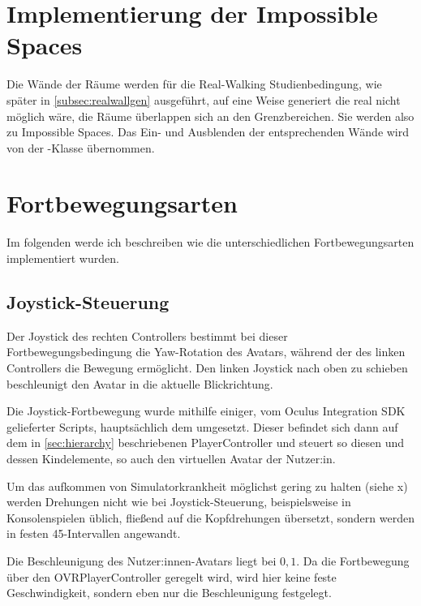 \section{Implementierung der Impossible Spaces}
Die Wände der Räume werden für die Real-Walking Studienbedingung, wie später in \autoref{subsec:realwallgen} ausgeführt, auf eine Weise generiert die real nicht möglich wäre, die Räume überlappen sich an den Grenzbereichen. Sie werden also zu Impossible Spaces. Das Ein- und Ausblenden der entsprechenden Wände wird von der -Klasse übernommen.

\section{Fortbewegungsarten}
Im folgenden werde ich beschreiben wie die unterschiedlichen Fortbewegungsarten implementiert wurden.

\subsection{Joystick-Steuerung} \label{subsec:joystick-implementation}
    Der Joystick des rechten Controllers bestimmt bei dieser Fortbewegungsbedingung die Yaw-Rotation des Avatars, während der des linken Controllers die Bewegung ermöglicht. Den linken Joystick nach oben zu schieben beschleunigt den Avatar in die aktuelle Blickrichtung.

    Die Joystick-Fortbewegung wurde mithilfe einiger, vom Oculus Integration SDK gelieferter Scripts, hauptsächlich dem  umgesetzt. Dieser befindet sich dann auf dem in \autoref{sec:hierarchy} beschriebenen PlayerController und steuert so diesen und dessen Kindelemente, so auch den virtuellen Avatar der Nutzer:in.

    Um das aufkommen von Simulatorkrankheit möglichst gering zu halten (siehe x) %
    werden Drehungen nicht wie bei Joystick-Steuerung, beispielsweise in Konsolenspielen üblich, fließend auf die Kopfdrehungen übersetzt, sondern werden in festen
    45\textdegree-Intervallen angewandt.

    Die Beschleunigung des Nutzer:innen-Avatars liegt bei $0,1$. Da die Fortbewegung über den OVRPlayerController geregelt wird, wird hier keine feste Geschwindigkeit, sondern eben nur die Beschleunigung festgelegt.

